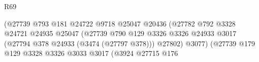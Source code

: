 \begin{lexlean}{R69}
\begin{coremodule}
                                                              (@27739
                                                                @793
                                                                @181
                                                                @24722
                                                                @9718
                                                                @25047
                                                                @20436
                                                                (@27782
                                                                  @792
                                                                  @3328
                                                                  @24721
                                                                  @24935
                                                                  @25047
                                                                  (@27739
                                                                    @790
                                                                    @129
                                                                    @3326
                                                                    @3326
                                                                    @24933
                                                                    @3017
                                                                    (@27794
                                                                      @378
                                                                      @24933
                                                                      (@3474 (@27797 @378)))
                                                                    @27802)
                                                                  @3077)
                                                                (@27739
                                                                  @179
                                                                  @129
                                                                  @3328
                                                                  @3326
                                                                  @3033
                                                                  @3017
                                                                  (@3924
                                                                    @27715
                                                                    @176

\end{coremodule}
\end{lexlean}
